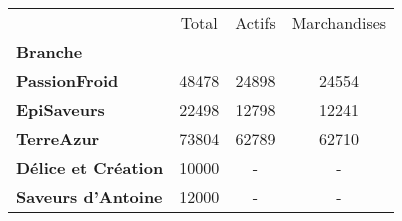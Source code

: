 \begin{tabular}{lccc}
\toprule
{} &  Total &  Actifs &  Marchandises \\
\textbf{Branche           } &        &         &               \\
\midrule
\textbf{PassionFroid      } &  48478 &   24898 &         24554 \\
\textbf{EpiSaveurs        } &  22498 &   12798 &         12241 \\
\textbf{TerreAzur         } &  73804 &   62789 &         62710 \\
\textbf{Délice et Création} &  10000 &       - &             - \\
\textbf{Saveurs d'Antoine } &  12000 &       - &             - \\
\bottomrule
\end{tabular}
